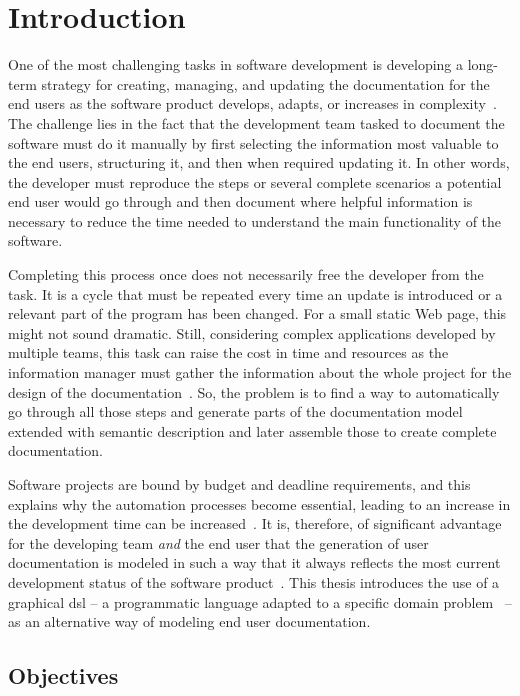 \chapter{Introduction}\label{ch:intro}

One of the most challenging tasks in software development is developing a long-term strategy for creating, managing, and updating the documentation for the end users as the software product develops, adapts, or increases in complexity~\cite{ieee6081814}. The challenge lies in the fact that the development team tasked to document the software must do it manually by first selecting the information most valuable to the end users, structuring it, and then when required updating it. In other words, the developer must reproduce the steps or several complete scenarios a potential end user would go through and then document where helpful information is necessary to reduce the time needed to understand the main functionality of the software. 

Completing this process once does not necessarily free the developer from the task. It is a cycle that must be repeated every time an update is introduced or a relevant part of the program has been changed. For a small static Web page, this might not sound dramatic. Still, considering complex applications developed by multiple teams, this task can raise the cost in time and resources as the information manager must gather the information about the whole project for the design of the documentation~\cite{ieee5712775}. So, the problem is to find a way to automatically go through all those steps and generate parts of the documentation model extended with semantic description and later assemble those to create complete documentation.

Software projects are bound by budget and deadline requirements, and this explains why the automation processes become essential, leading to an increase in the development time can be increased~\cite{despa2014comparative}. It is, therefore, of significant advantage for the developing team \textit{and} the end user that the generation of user documentation is modeled in such a way that it always reflects the most current development status of the software product~\cite{waits_et_al}. This thesis introduces the use of a graphical \gls{dsl} -- a programmatic language adapted to a specific domain problem~\cite{perez-et_al} -- as an alternative way of modeling end user documentation.

\section{Objectives}\label{sec:objectives}

